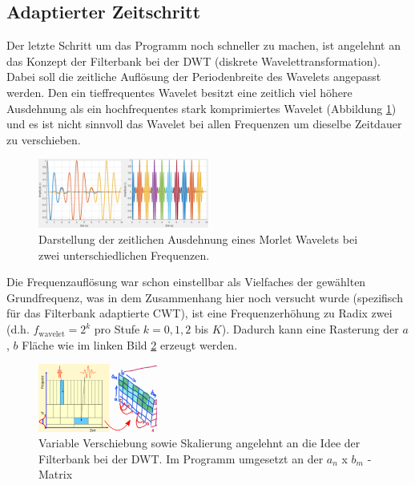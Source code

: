 \subsection{Adaptierter Zeitschritt
	\label{wavelets:subsection:AdaptierterZeitschritt}}
Der letzte Schritt um das Programm noch schneller zu machen, ist angelehnt an das Konzept der Filterbank bei der DWT (diskrete Wavelettransformation). Dabei soll die zeitliche Auflösung der Periodenbreite des Wavelets angepasst werden. Den ein tieffrequentes Wavelet besitzt eine zeitlich viel höhere Ausdehnung als ein hochfrequentes stark komprimiertes Wavelet (Abbildung \ref{wavelet:fig:adaptedShift_b}) und es ist nicht sinnvoll das Wavelet bei allen Frequenzen um dieselbe Zeitdauer zu verschieben.

\begin{figure}
	\centering
	\includegraphics[width=0.5\textwidth]{papers/wavelets/images/15-1_adaptedShift-b.png}
	\caption{Darstellung der zeitlichen Ausdehnung eines Morlet Wavelets bei zwei unterschiedlichen Frequenzen.}
	\label{wavelet:fig:adaptedShift_b}
\end{figure}

Die Frequenzauflösung war schon einstellbar als Vielfaches der gewählten Grundfrequenz, was in dem Zusammenhang hier noch versucht wurde (spezifisch für das Filterbank adaptierte CWT), ist eine Frequenzerhöhung zu Radix zwei (d.h. $f_\text{wavelet} = 2^k$ pro Stufe $k = 0, 1, 2$ bis $K$). Dadurch kann eine Rasterung der $a$, $b$ Fläche wie im linken Bild \ref{wavelet:fig:adaptedFrequndTime} erzeugt werden.

\begin{figure}
	\centering
	\includegraphics[width=0.35\textwidth]{papers/wavelets/images/15-2_adaptedFrequndTime.png}
	\caption{Variable Verschiebung sowie Skalierung angelehnt an die Idee der Filterbank bei der DWT. Im Programm umgesetzt an der $a_n$ x $b_m$ - Matrix}
	\label{wavelet:fig:adaptedFrequndTime}
\end{figure}

